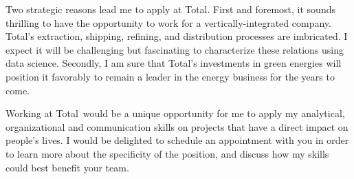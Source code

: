 \documentclass[11pt, a4paper]{awesome-cv}
\newcommand{\company}{Total}
\begin{document}
\begin{cvletter}
Two strategic reasons lead me to apply at \company.    
First and foremost, it sounds thrilling to have the opportunity to work for a vertically-integrated company. Total's extraction,  shipping, refining, and distribution processes are imbricated. I expect it will be challenging but fascinating to characterize these relations using data science.  
Secondly, I am sure that \company's investments in green energies will position it favorably to remain a leader in the energy business for the years to come. 

Working at \company~would be a unique opportunity for me to apply my analytical, organizational and communication skills on projects that have a direct impact on people's lives. 
I would be delighted to schedule an appointment with you in order to learn more about the specificity of the position, and discuss how my skills could best benefit your team. 
\end{cvletter}


\makeletterclosing
\end{document}
